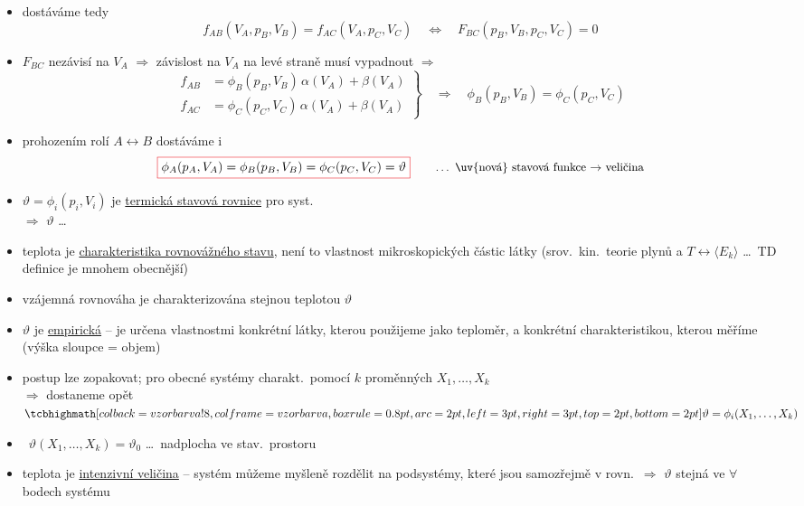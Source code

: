 \begin{itemize}
  \item dostáváme tedy \quad {}
  \[
    f_{AB}(V_A,p_B,V_B) = f_{AC}(V_A,p_C,V_C) \quad\Leftrightarrow\quad F_{BC}(p_B,V_B,p_C,V_C) = 0
  \]
  \item $F_{BC}$ nezávisí na $V_A$ $\Rightarrow$ závislost na $V_A$ na levé straně musí vypadnout $\Rightarrow$
  \[
    \left.\begin{aligned}
      f_{AB} &= \phi_B(p_B,V_B)\,\alpha(V_A) + \beta(V_A) \\
      f_{AC} &= \phi_C(p_C,V_C)\,\alpha(V_A) + \beta(V_A)
    \end{aligned}\right\}
    \quad\Rightarrow\quad \phi_B(p_B,V_B) = \phi_C(p_C,V_C)
  \]
  \item prohozením rolí $A\leftrightarrow B$ dostáváme i
  \[
    \fcolorbox{Red}{white}{$\displaystyle \phi_A(p_A,V_A) = \phi_B(p_B,V_B) = \phi_C(p_C,V_C) = \vartheta$}
    \qquad\text{\small\dots\ \uv{nová} stavová funkce $\to$ veličina}
  \]
  \item $\vartheta = \phi_i(p_i,V_i)$ je \underline{termická stavová rovnice} pro syst.\ 
        \quad {} \\
        $\Rightarrow$ $\vartheta$ \dots\ 
  \item teplota je \underline{charakteristika rovnovážného stavu}, není to vlastnost mikroskopických částic látky (srov.\ kin.\ teorie plynů a $T\leftrightarrow\langle E_k\rangle$ \dots\ TD definice je mnohem obecnější)
  \item vzájemná rovnováha je charakterizována stejnou teplotou $\vartheta$
  \item $\vartheta$ je \underline{empirická} -- je určena vlastnostmi konkrétní látky, kterou použijeme jako teploměr, a konkrétní charakteristikou, kterou měříme (výška sloupce = objem)
  \item postup lze zopakovat; pro obecné systémy charakt.\ pomocí $k$ proměnných $X_1,\dots,X_k$ \\
        \hspace*{4cm} $\Rightarrow$ dostaneme opět \quad $\vzorec{\vartheta = \phi_i(X_1,\dots,X_k)}$
  \item {} \ $\vartheta(X_1,\dots,X_k) = \vartheta_0$ \quad \dots\ nadplocha ve stav.\ prostoru
  \item teplota je \underline{intenzivní veličina} -- systém můžeme myšleně rozdělit na podsystémy, které jsou samozřejmě v rovn.\ $\Rightarrow$ $\vartheta$ stejná ve $\forall$ bodech systému
\end{itemize}

